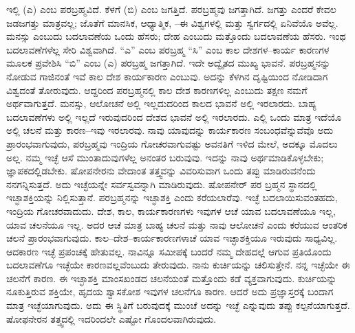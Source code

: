     ಇಲ್ಲಿ (ಎ) ಎಂಬ ಪರಬ್ರಹ್ಮವಿದೆ. ಕೆಳಗೆ (ಬಿ) ಎಂಬ ಜಗತ್ತಿದೆ. ಪರಬ್ರಹ್ಮವು ಜಗತ್ತಾಗಿದೆ. ಜಗತ್ತು ಎಂದರೆ ಕೇವಲ ಜಡಜಗತ್ತು ಮಾತ್ರವಲ್ಲ; ಜೊತೆಗೆ ಮಾನಸಿಕ, ಆಧ್ಯಾತ್ಮಿಕ, –ಈ ವಿಶ್ವಗಳಲ್ಲಿ ಮತ್ತು ಸ್ವರ್ಗದಲ್ಲಿ ಏನಿವೆಯೊ ಅವೆಲ್ಲ. ಮನಸ್ಸು ಎಂಬುದು ಬದಲಾವಣೆಯ ಒಂದು ಹೆಸರು; ದೇಹ ಎಂಬುದು ಮತ್ತೊಂದು ಬದಲಾವಣೆಯ ಹೆಸರು. ಇಂಥ ಬದಲಾವಣೆಗಳೆಲ್ಲ ಸೇರಿ ವಿಶ್ವವಾಗಿದೆ. “ಎ” ಎಂಬ ಪರಬ್ರಹ್ಮ “ಸಿ” ಎಂಬ ಕಾಲ ದೇಶಗಳ–ಕಾರ್ಯ ಕಾರಣಗಳ ಮೂಲಕ ಪ್ರವೇಶಿಸಿ “ಬಿ” ಎಂಬ (ಎ) ಪರಬ್ರಹ್ಮ ಜಗತ್ತಾಗಿದೆ. ಇದೇ ಅದ್ವೈತದ ಮುಖ್ಯ ಭಾವನೆ. ಪರಬ್ರಹ್ಮನನ್ನು ನೋಡುವ ಗಾಜಿನಂತೆ ಇವೆ ಕಾಲ ದೇಶ ಕಾರ್ಯಕಾರಣ ಎಂಬುವು. ಅದನ್ನು ಕೆಳಗಿನ ದೃಷ್ಟಿಯಿಂದ ನೋಡಿದಾಗ ವಿಶ್ವದಂತೆ ತೋರುವುದು. ಆದ್ದರಿಂದ ಪರಬ್ರಹ್ಮನಲ್ಲಿ ಕಾಲ ದೇಶ ಕಾರಣಗಳಿಲ್ಲ ಎಂಬುದು ತಕ್ಷಣ ನಮಗೆ ಅರ್ಥವಾಗುತ್ತದೆ. ಮನಸ್ಸು, ಆಲೋಚನೆ ಅಲ್ಲಿ ಇಲ್ಲದುದರಿಂದ ಕಾಲದ ಭಾವನೆ ಅಲ್ಲಿ ಇರಲಾರದು. ಬಾಹ್ಯ ಬದಲಾವಣೆಗಳು ಅಲ್ಲಿ ಇಲ್ಲದೆ ಇರುವುದರಿಂದ ದೇಶದ ಭಾವನೆ ಅಲ್ಲಿ ಇರಲಾರದು. ಎಲ್ಲಿ ಒಂದು ಮಾತ್ರ ಇದೆಯೊ ಅಲ್ಲಿ ಚಲನೆ ಮತ್ತು ಕಾರಣ–ಇವು ಇರಲಾರವು. ನಾವು ಯಾವುದನ್ನು ಕಾರ್ಯಕಾರಣ ಸಂಬಂಧವೆನ್ನುವೆವೊ ಅದು ಪ್ರಾರಂಭವಾಗುವುದು, ಪರಬ್ರಹ್ಮವು ಇಂದ್ರಿಯ ಗೋಚರವಾಗುವಷ್ಟು ಅವನತಿಗೆ ಇಳಿದ ಮೇಲೆ, ಅದಕ್ಕೂ ಮೊದಲು ಅಲ್ಲ. ನಮ್ಮ ಇಚ್ಛೆ ಆಸೆ ಮುಂತಾದುವುಗಳೆಲ್ಲ ಅನಂತರ ಬರುವುವು. ಇದನ್ನು ನಾವು ಅರ್ಥಮಾಡಿಕೊಳ್ಳಬೇಕು; ಜ್ಞಾಪಕದಲ್ಲಿಡಬೇಕು. ಷೋಪನೇರನು ವೇದಾಂತ ತತ್ತ್ವವನ್ನು ವಿವರಿಸುವಾಗ ಒಂದು ತಪ್ಪು ಮಾಡಿರುವನೆಂದು ನನಗನ್ನಿಸುತ್ತದೆ. ಅದು ಇಚ್ಛೆಯನ್ನೇ ಸರ್ವಸ್ವವನ್ನಾಗಿ ಮಾಡಿರುವುದು. ಷೋಪನೇರ್​ ಪರ ಬ್ರಹ್ಮನ ಸ್ಥಾನದಲ್ಲಿ ಇಚ್ಛಾಶಕ್ತಿಯನ್ನು ನಿಲ್ಲಿಸುತ್ತಾನೆ. ಪರಬ್ರಹ್ಮನನ್ನು ಇಚ್ಛಾಶಕ್ತಿ ಎಂದು ಕರೆಯಲಾರೆವು. ಇಚ್ಛೆ ಬದಲಾಯಿಸುವಂತಹದು, ಇಂದ್ರಿಯ ಗೋಚರವಾದುದು. ದೇಶ, ಕಾಲ, ಕಾರ್ಯಕಾರಣಗಳು ಇವುಗಳ ಆಚೆ ಯಾವ ಬದಲಾವಣೆಯೂ ಇಲ್ಲ, ಯಾವ ಚಲನೆಯೂ ಇಲ್ಲ. ಅದರ ಆಚೆ ಮಾತ್ರ ಬಾಹ್ಯ ಚಲನೆ ಮತ್ತು ನಾವು ಆಲೋಚನೆ ಎಂದು ಕರೆಯುವ ಆಂತರಿಕ ಚಲನೆ ಪ್ರಾರಂಭವಾಗುವುದು. ಕಾಲ–ದೇಶ–ಕಾರ್ಯಕಾರಣಗಳಾಚೆ ಯಾವ ಇಚ್ಛಾಶಕ್ತಿಯೂ ಇರುವುದು ಸಾಧ್ಯವಿಲ್ಲ. ಆದಕಾರಣ ಇಚ್ಛೆ ಪ್ರಪಂಚಕ್ಕೆ ಹೇತುವಲ್ಲ. ನಾವಿನ್ನೂ ಸಮೀಪಕ್ಕೆ ಬಂದರೆ ನಮ್ಮ ದೇಹದಲ್ಲೆ ಆಗುವ ಪ್ರತಿಯೊಂದು ಬದಲಾವಣೆಗೂ ಇಚ್ಛೆಯೇ ಕಾರಣವಲ್ಲವೆಂಬುದು ತೇರುವುದು. ನಾನು ಕುರ್ಚಿಯನ್ನು ಚಲಿಸುತ್ತೇನೆ. ನನ್ನ ಇಚ್ಛೆಯೇ ಈ ಚಲನೆಗೆ ಕಾರಣ. ಈ ಇಚ್ಛಾಶಕ್ತಿ ಮಾಂಸಖಂಡದ ಚಲನೆಯಂತೆ ಮತ್ತೊಂದು ಕಡೆ ವ್ಯಕ್ತವಾಗುವುದು. ಕುರ್ಚಿಯನ್ನು ನೂಕುತ್ತಿರುವ ಶಕ್ತಿಯೇ, ಹೃದಯ ಶ್ವಾಸಕೋಶ ಇವುಗಳ ಚಲನೆಗೂ ಕಾರಣ. ಆದರೆ ಅದು ಪ್ರಜ್ಞಾಸ್ತರಕ್ಕೆ ಬಂದಾಗ ಮಾತ್ರ ಇಚ್ಛೆಯಾಗುವುದು. ಅದು ಈ ಸ್ಥಿತಿಗೆ ಬರುವುದಕ್ಕೆ ಮುಂಚೆ ಅದನ್ನು ಇಚ್ಛೆ ಎನ್ನುವುದು ತಪ್ಪು ಕಲ್ಪನೆಯಾಗುತ್ತದೆ. ಷೋಫನೇರನ ತತ್ತ್ವದಲ್ಲಿ ಇದರಿಂದಲೇ ಎಷ್ಟೋ ಗೊಂದಲವಾಗಿರುವುದು.

